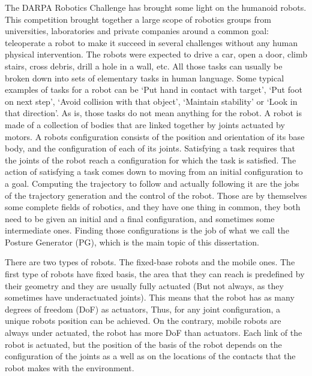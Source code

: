 The DARPA Robotics Challenge has brought some light on the humanoid robots.
This competition brought together a large scope of robotics groups from universities, laboratories and private companies around a common goal: teleoperate a robot to make it succeed in several challenges without any human physical intervention.
The robots were expected to drive a car, open a door, climb stairs, cross debris, drill a hole in a wall, etc.
All those tasks can usually be broken down into sets of elementary tasks in human language.
Some typical examples of tasks for a robot can be `Put hand in contact with target', `Put foot on next step', `Avoid collision with that object', `Maintain stability' or `Look in that direction'.
As is, those tasks do not mean anything for the robot.
A robot is made of a collection of bodies that are linked together by joints actuated by motors.
A robots configuration consists of the position and orientation of its base body, and the configuration of each of its joints.
Satisfying a task requires that the joints of the robot reach a configuration for which the task is satisfied.
The action of satisfying a task comes down to moving from an initial configuration to a goal.
Computing the trajectory to follow and actually following it are the jobs of the trajectory generation and the control of the robot.
Those are by themselves some complete fields of robotics, and they have one thing in common, they both need to be given an initial and a final configuration, and sometimes some intermediate ones.
Finding those configurations is the job of what we call the Posture Generator (PG), which is the main topic of this dissertation.

There are two types of robots. The fixed-base robots and the mobile ones.
The first type of robots have fixed basis, the area that they can reach is predefined by their geometry and they are usually fully actuated (But not always, as they sometimes have underactuated joints).
This means that the robot has as many degrees of freedom (DoF) as actuators, Thus, for any joint configuration, a unique robots position can be achieved.
On the contrary, mobile robots are always under actuated, the robot has more DoF than actuators.
Each link of the robot is actuated, but the position of the basis of the robot depends on the configuration of the joints as a well as on the locations of the contacts that the robot makes with the environment.


